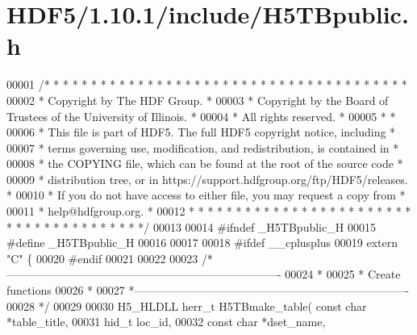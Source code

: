 \hypertarget{_h_d_f5_21_810_81_2include_2_h5_t_bpublic_8h_source}{}\section{H\+D\+F5/1.10.1/include/\+H5\+T\+Bpublic.h}
\label{_h_d_f5_21_810_81_2include_2_h5_t_bpublic_8h_source}

\begin{DoxyCode}
00001 \textcolor{comment}{/* * * * * * * * * * * * * * * * * * * * * * * * * * * * * * * * * * * * * * *}
00002 \textcolor{comment}{ * Copyright by The HDF Group.                                               *}
00003 \textcolor{comment}{ * Copyright by the Board of Trustees of the University of Illinois.         *}
00004 \textcolor{comment}{ * All rights reserved.                                                      *}
00005 \textcolor{comment}{ *                                                                           *}
00006 \textcolor{comment}{ * This file is part of HDF5.  The full HDF5 copyright notice, including     *}
00007 \textcolor{comment}{ * terms governing use, modification, and redistribution, is contained in    *}
00008 \textcolor{comment}{ * the COPYING file, which can be found at the root of the source code       *}
00009 \textcolor{comment}{ * distribution tree, or in https://support.hdfgroup.org/ftp/HDF5/releases.  *}
00010 \textcolor{comment}{ * If you do not have access to either file, you may request a copy from     *}
00011 \textcolor{comment}{ * help@hdfgroup.org.                                                        *}
00012 \textcolor{comment}{ * * * * * * * * * * * * * * * * * * * * * * * * * * * * * * * * * * * * * * */}
00013 
00014 \textcolor{preprocessor}{#ifndef \_H5TBpublic\_H}
00015 \textcolor{preprocessor}{#define \_H5TBpublic\_H}
00016 
00017 
00018 \textcolor{preprocessor}{#ifdef \_\_cplusplus}
00019 \textcolor{keyword}{extern} \textcolor{stringliteral}{"C"} \{
00020 \textcolor{preprocessor}{#endif}
00021 
00022 
00023 \textcolor{comment}{/*-------------------------------------------------------------------------}
00024 \textcolor{comment}{ *}
00025 \textcolor{comment}{ * Create functions}
00026 \textcolor{comment}{ *}
00027 \textcolor{comment}{ *-------------------------------------------------------------------------}
00028 \textcolor{comment}{ */}
00029 
00030 H5\_HLDLL herr\_t  H5TBmake\_table( \textcolor{keyword}{const} \textcolor{keywordtype}{char} *table\_title,
00031                        hid\_t loc\_id,
00032                        \textcolor{keyword}{const} \textcolor{keywordtype}{char} *dset\_name,

\end{DoxyCode}
